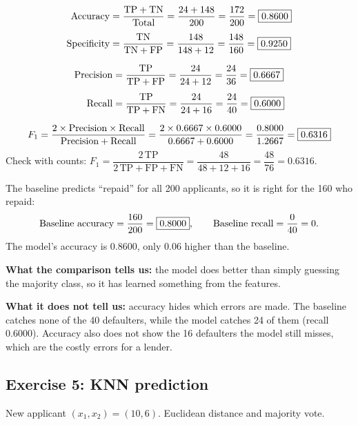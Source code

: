 \begin{align*}
\text{Accuracy}    &= \frac{\text{TP}+\text{TN}}{\text{Total}} = \frac{24+148}{200} = \frac{172}{200} = \boxed{0.8600}\\[4pt]
\text{Specificity} &= \frac{\text{TN}}{\text{TN}+\text{FP}} = \frac{148}{148+12} = \frac{148}{160} = \boxed{0.9250}
\end{align*}

\begin{align*}
\text{Precision} &= \frac{\text{TP}}{\text{TP}+\text{FP}} = \frac{24}{24+12} = \frac{24}{36} = \boxed{0.6667}\\[4pt]
\text{Recall}    &= \frac{\text{TP}}{\text{TP}+\text{FN}} = \frac{24}{24+16} = \frac{24}{40} = \boxed{0.6000}
\end{align*}

\[
  F_1 = \frac{2 \times \text{Precision} \times \text{Recall}}{\text{Precision} + \text{Recall}}
      = \frac{2 \times 0.6667 \times 0.6000}{0.6667 + 0.6000}
      = \frac{0.8000}{1.2667} = \boxed{0.6316}
\]
Check with counts: $F_1 = \dfrac{2\,\text{TP}}{2\,\text{TP}+\text{FP}+\text{FN}} = \dfrac{48}{48+12+16} = \dfrac{48}{76} = 0.6316$.

The baseline predicts ``repaid'' for all 200 applicants, so it is right for the 160 who repaid:
\[
  \text{Baseline accuracy} = \frac{160}{200} = \boxed{0.8000},
  \qquad \text{Baseline recall} = \frac{0}{40} = 0 .
\]
The model's accuracy is $0.8600$, only $0.06$ higher than the baseline.

\textbf{What the comparison tells us:} the model does better than simply guessing the majority
class, so it has learned something from the features.

\textbf{What it does not tell us:} accuracy hides which errors are made. The baseline catches
none of the 40 defaulters, while the model catches 24 of them (recall 0.6000). Accuracy also
does not show the 16 defaulters the model still misses, which are the costly errors for a lender.

\subsection{Exercise 5: KNN prediction}
New applicant $(x_1,x_2) = (10,6)$. Euclidean distance and majority vote.

